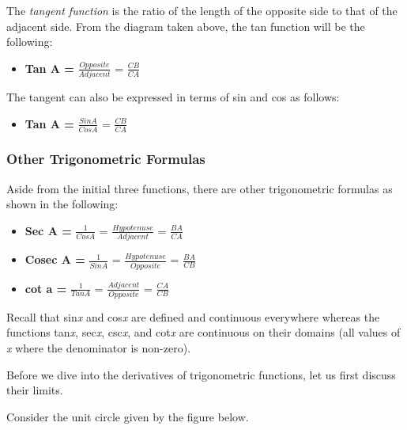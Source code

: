 \documentclass[
  letterpaper,
  DIV=11,
  numbers=noendperiod]{scrartcl}
\providecommand{\tightlist}{%
  \setlength{\itemsep}{0pt}\setlength{\parskip}{0pt}}\usepackage{longtable,booktabs,array}
\begin{document}
The \emph{tangent function} is the ratio of the length of the opposite
side to that of the adjacent side. From the diagram taken above, the tan
function will be the following:

\begin{itemize}
\tightlist
\item
  \textbf{Tan A =} \(\frac{Opposite}{Adjacent}\) = \(\frac{CB}{CA}\)
\end{itemize}

The tangent can also be expressed in terms of sin and cos as follows:

\begin{itemize}
\tightlist
\item
  \textbf{Tan A =} \(\frac{Sin A}{Cos A}\) = \(\frac{CB}{CA}\)
\end{itemize}

\subsubsection{Other Trigonometric
Formulas}\label{other-trigonometric-formulas}

Aside from the initial three functions, there are other trigonometric
formulas as shown in the following:

\begin{itemize}
\item
  \textbf{Sec A =} \(\frac{1}{Cos A}\) = \(\frac{Hypotenuse}{Adjacent}\)
  = \(\frac{BA}{CA}\)
\item
  \textbf{Cosec A =} \(\frac{1}{Sin A}\) =
  \(\frac{Hypotenuse}{Opposite}\) = \(\frac{BA}{CB}\)
\item
  \textbf{cot a =} \(\frac{1}{Tan A}\) = \(\frac{Adjacent}{Opposite}\) =
  \(\frac{CA}{CB}\)
\end{itemize}

Recall that sin\emph{x} and cos\emph{x} are defined and continuous
everywhere whereas the functions tan\emph{x}, sec\emph{x}, csc\emph{x},
and cot\emph{x} are continuous on their domains (all values of \emph{x}
where the denominator is non-zero).

Before we dive into the derivatives of trigonometric functions, let us
first discuss their limits.

Consider the unit circle given by the figure below.
\end{document}
